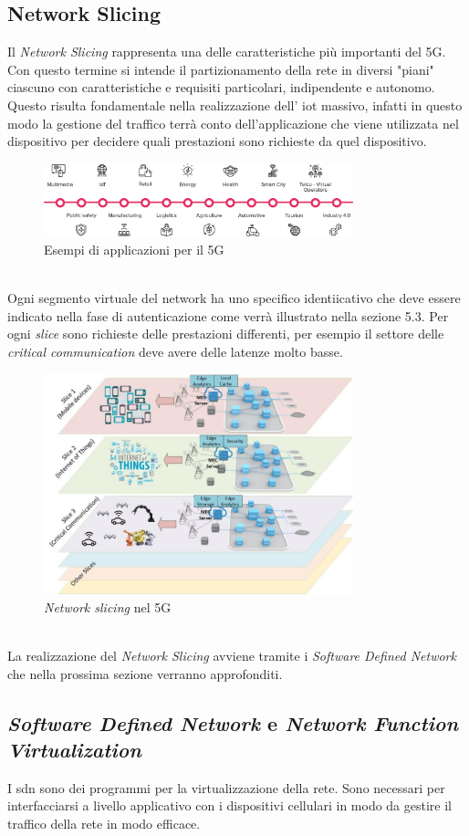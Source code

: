 \clearpage

\subsection{Network Slicing}
Il \textit{Network Slicing} rappresenta una delle caratteristiche più importanti del 5G. Con questo termine si intende il partizionamento della
rete in diversi "piani" ciascuno con caratteristiche e requisiti particolari, indipendente e autonomo. Questo risulta fondamentale nella realizzazione 
dell' \gls{iot} massivo, infatti in questo modo la gestione del traffico terrà conto dell'applicazione che viene utilizzata nel dispositivo per decidere quali prestazioni sono 
richieste da quel dispositivo.
\begin{figure}[ht]
    \centering
    \includegraphics[width=0.8\textwidth]{images/5g-eg-of-use.png}
    \caption{Esempi di applicazioni per il 5G}
\end{figure}\\
Ogni segmento virtuale del network ha uno specifico identiicativo che deve essere indicato nella fase di autenticazione come verrà illustrato nella sezione 5.3. Per ogni \textit{slice} sono 
richieste delle prestazioni differenti, per esempio il settore delle \textit{critical communication} deve avere delle latenze molto basse.
\begin{figure}[ht]
    \centering
    \includegraphics[width=0.8\textwidth]{images/5g-slicing.jpg}
    \caption{\textit{Network slicing} nel 5G}
\end{figure}\\
La realizzazione del \textit{Network Slicing} avviene tramite i \textit{Software Defined Network} che nella prossima sezione verranno approfonditi.

\clearpage

\subsection{\textit{Software Defined Network} e  \textit{Network Function Virtualization}}
I \gls{sdn} sono dei programmi per la virtualizzazione della rete. Sono necessari per interfacciarsi a livello applicativo con i dispositivi cellulari 
in modo da gestire il traffico della rete in modo efficace\cite{5g-sdn}.